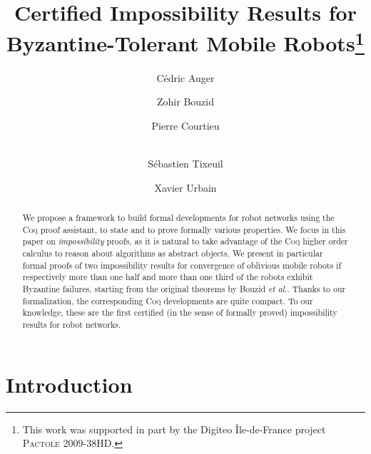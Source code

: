 \documentclass[11pt,a4]{llncs}
\newcommand{\x}{\xspace}
\newcommand{\coq}{\textsc{Coq}\x}
\begin{document}
\newpage

\title{Certified Impossibility Results for \\ Byzantine-Tolerant
  Mobile Robots\thanks{This work was supported in part by the Digiteo Île-de-France
project \textsc{Pactole} 2009-38HD.}}

\author{Cédric Auger
\and Zohir Bouzid
\and Pierre Courtieu
\and\\ Sébastien Tixeuil 
\and Xavier Urbain 
}

\maketitle

\begin{abstract}
  We propose a framework to build formal developments for robot
  networks using the \coq proof assistant, to state and to prove
  formally various properties. We focus in this paper on
  \emph{impossibility} proofs, as it is natural to take advantage of
  the \coq higher order calculus to reason about algorithms as
  abstract objects. We present in particular formal proofs of two impossibility results for convergence of
  oblivious mobile robots if respectively more than one half and more
  than one third of the robots exhibit Byzantine failures, starting
  from the original theorems by Bouzid \emph{et al.}. Thanks to our formalization, the
  corresponding \coq developments are quite compact. To our knowledge,
  these are the first certified (in the sense of formally proved)
  impossibility results for robot networks.

\end{abstract}

\newpage

\section{Introduction}
\label{sec:introduction}
\end{document}

